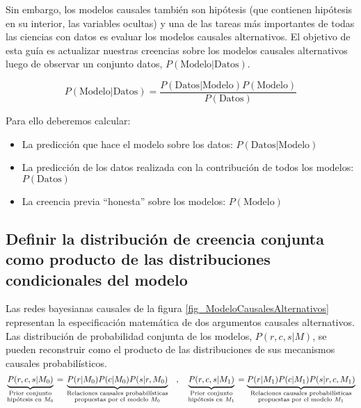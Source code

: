 \documentclass[a4paper,10pt]{article}
\begin{document}
Sin embargo, los modelos causales también son hipótesis (que contienen hipótesis en su interior, las variables ocultas) y una de las tareas más importantes de todas las ciencias con datos es evaluar los modelos causales alternativos.
%
El objetivo de esta guía es actualizar nuestras creencias sobre los modelos causales alternativos luego de observar un conjunto datos, $P(\text{Modelo}|\text{Datos})$.

\begin{equation*}
P(\text{Modelo}|\text{Datos}) = \frac{P(\text{Datos}|\text{Modelo})P(\text{Modelo})}{P(\text{Datos})}
\end{equation*}

Para ello deberemos calcular:
\vspace{-0.1cm}
\begin{itemize}  \setlength\itemsep{-0.1cm}
\item La predicción que hace el modelo sobre los datos: $P(\text{Datos}|\text{Modelo})$
\item La predicción de los datos realizada con la contribución de todos los modelos: $P(\text{Datos})$
\item La creencia previa ``honesta'' sobre los modelos: $P(\text{Modelo})$
\end{itemize}


\subsection{Definir la distribución de creencia conjunta como producto de las distribuciones condicionales del modelo}

Las redes bayesianas causales de la figura \ref{fig_ModeloCausalesAlternativos} representan la especificación matemática de dos argumentos causales alternativos.
%
Las distribución de probabilidad conjunta de los modelos, $P(r,c,s|M)$, se pueden reconstruir como el producto de las distribuciones de sus mecanismos causales probabilísticos.
%
$$\underbrace{P(r,c,s|M_0)}_{\hfrac{\text{\scriptsize Prior conjunto}}{\text{\scriptsize hipótesis en $M_0$}}} = \underbrace{P(r|M_0)P(c|M_0)P(s|r,M_0)}_{\hfrac{\text{\scriptsize Relaciones causales probabilísticas}}{\text{\scriptsize propuestas por el modelo $M_0$}}} \hspace{0.3cm} , \hspace{0.3cm} \underbrace{P(r,c,s|M_1)}_{\hfrac{\text{\scriptsize Prior conjunto}}{\text{\scriptsize hipótesis en $M_1$}}} = \underbrace{P(r|M_1)P(c|M_1)P(s|r,c,M_1)}_{\hfrac{\text{\scriptsize Relaciones causales probabilísticas}}{\text{\scriptsize propuestas por el modelo $M_1$}}}$$
\end{document}

